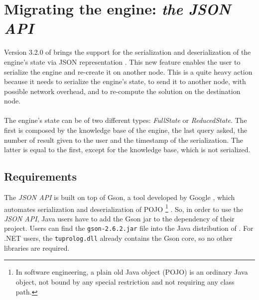 \clearpage

\section{Migrating the engine: \textit{the JSON API}}
Version 3.2.0 of \tuprolog{} brings the support for the serialization and deserialization of the engine's state via JSON representation \cite{JSON}. This new feature enables the user to serialize the engine and re-create it on another node. This is a quite heavy action because it needs to serialize the engine's state, to send it to another node, with possible network overhead, and to re-compute the solution on the destination node.\\ \\
The \tuprolog{} engine's state can be of two different types: \textit{FullState} or \textit{ReducedState}. The first is composed by the knowledge base of the engine, the last query asked, the number of result given to the user and the timestamp of the serialization. The latter is equal to the first, except for the knowledge base, which is not serialized. 

\subsection{Requirements}
The \textit{JSON API} is built on top of Gson, a tool developed by Google \cite{GSON}, which automates serialization and deserialization of POJO \footnote{In software engineering, a plain old Java object (POJO) is an ordinary Java object, not bound by any special restriction and not requiring any class path.} \cite{POJO}. So, in order to use the \tuprolog{} \textit{JSON API}, Java users have to add the Gson jar \cite{GSON} to the dependency of their project. Users can find the \texttt{gson-2.6.2.jar} file into the Java distribution of \tuprolog{}. For .NET users, the \texttt{tuprolog.dll} already contains the Gson core, so no other libraries are required.

